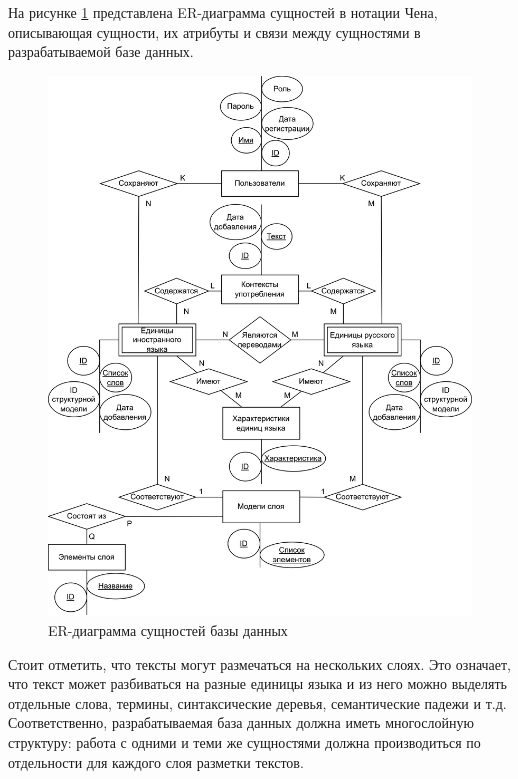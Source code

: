 На рисунке \ref{fig:er} представлена ER-диаграмма сущностей в нотации Чена, описывающая сущности, их атрибуты и связи между сущностями в разрабатываемой базе данных.

\begin{figure}[h]
	\centering
	\includegraphics[width=\textwidth ]{img/ER/ER.drawio.png}
	\caption{ER-диаграмма сущностей базы данных}
	\label{fig:er}
\end{figure} 

\clearpage

Стоит отметить, что тексты могут размечаться на нескольких слоях. Это означает, что текст может разбиваться на разные единицы языка и из него можно выделять отдельные слова, термины, синтаксические деревья, семантические падежи и т.д. Соответственно, разрабатываемая база данных должна иметь многослойную структуру: работа с одними и теми же сущностями должна производиться по отдельности для каждого слоя разметки текстов.



